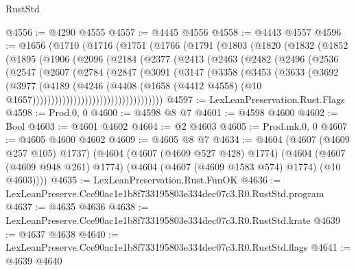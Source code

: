\begin{lexlean}{RustStd}
\begin{coremodule}
@4556 := @4290 @4555
@4557 := @4445 @4556
@4558 := @4443 @4557
@4596 := @1656
    (@1710
      (@1716
        (@1751
          (@1766
            (@1791
              (@1803
                (@1820
                  (@1832
                    (@1852
                      (@1895
                        (@1906
                          (@2096
                            (@2184
                              (@2377
                                (@2413
                                  (@2463
                                    (@2482
                                      (@2496
                                        (@2536
                                          (@2547
                                            (@2607
                                              (@2784
                                                (@2847
                                                  (@3091
                                                    (@3147
                                                      (@3358
                                                        (@3453
                                                          (@3633
                                                            (@3692
                                                              (@3977
                                                                (@4189
                                                                  (@4246
                                                                    (@4408
                                                                      (@1658
                                                                        (@4412 @4558)
                                                                        (@10
                                                                          @1657)))))))))))))))))))))))))))))))))))
@4597 := LexLeanPreservation.Rust.Flags
@4598 := Prod.{0, 0}
@4600 := @4598 @8 @7
@4601 := @4598 @4600
@4602 := Bool
@4603 := @4601 @4602
@4604 := @2 @4603
@4605 := Prod.mk.{0, 0}
@4607 := @4605 @4600 @4602
@4609 := @4605 @8 @7
@4634 := @4604
    (@4607 (@4609 @257 @105) @1737)
    (@4604
      (@4607 (@4609 @527 @428) @1774)
      (@4604 (@4607 (@4609 @948 @261) @1774) (@4604 (@4607 (@4609 @1583 @574) @1774) (@10 @4603))))
@4635 := LexLeanPreservation.Rust.FunOK
@4636 := LexLeanPreserve.Cce90ac1e1b8f733195803e334dec07c3.R0.RustStd.program
@4637 := @4635 @4636
@4638 := LexLeanPreserve.Cce90ac1e1b8f733195803e334dec07c3.R0.RustStd.krate
@4639 := @4637 @4638
@4640 := LexLeanPreserve.Cce90ac1e1b8f733195803e334dec07c3.R0.RustStd.flags
@4641 := @4639 @4640

\end{coremodule}
\end{lexlean}
